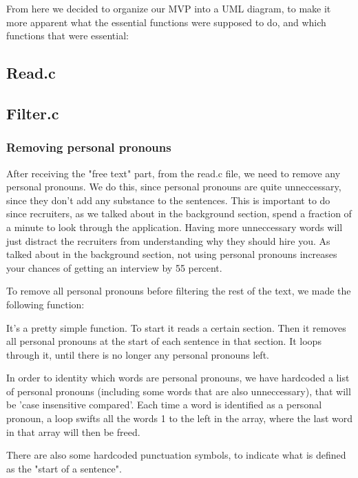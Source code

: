 From here we decided to organize our MVP into a UML diagram, to make it more apparent
what the essential functions were supposed to do, and which functions that were essential:

\subsection{Read.c}
\subsection{Filter.c}


\subsubsection{Removing personal pronouns}
After receiving the "free text" part, from the read.c file, we need to remove any personal pronouns.
We do this, since personal pronouns are quite unneccessary, since they don't add any substance to the sentences.
This is important to do since recruiters, as we talked about in the background section, spend a fraction of a minute
to look through the application. Having more unneccessary words will just distract the recruiters from understanding why they should hire you.
As talked about in the background section, not using personal pronouns increases your
chances of getting an interview by 55 percent.

To remove all personal pronouns before filtering the rest of the text, we made the following function:

It's a pretty simple function. To start it reads a certain section. Then it removes all personal pronouns at the start of each sentence in that section.
It loops through it, until there is no longer any personal pronouns left.

In order to identity which words are personal pronouns, we have hardcoded a list of personal pronouns (including some words that are also unneccessary), that will be 'case insensitive compared'.
Each time a word is identified as a personal pronoun, a loop swifts all the words 1 to the left in the array, where the last word in that array will then be freed.

There are also some hardcoded punctuation symbols, to indicate what is defined as the "start of a sentence". 

